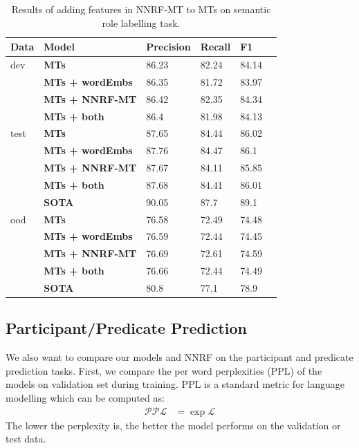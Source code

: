 \documentclass[a4paper]{article}
\begin{document}
\begin{table}[t]
\centering
\begin{tabular}{llllll}
\textbf{Data} & \textbf{Model}        &   Precision &   Recall &   F1   \\ \hline
dev    &   \textbf{MTs}               &   86.23 &   82.24    &   84.14    \\
       &   \textbf{MTs + wordEmbs}    &   86.35 &   81.72    &   83.97    \\
       &   \textbf{MTs + NNRF-MT}     &   86.42 &   82.35    &   84.34    \\
       &   \textbf{MTs + both}        &   86.4  &   81.98    &   84.13    \\ \hline
test   &   \textbf{MTs}               &   87.65 &   84.44    &   86.02    \\
       &   \textbf{MTs + wordEmbs}    &   87.76 &   84.47    &   86.1     \\
       &   \textbf{MTs + NNRF-MT}     &   87.67 &   84.11    &   85.85    \\
       &   \textbf{MTs + both}        &   87.68 &   84.41    &   86.01    \\ 
       &   \textbf{SOTA}              &   90.05 &   87.7     &   89.1     \\ \hline
ood    &   \textbf{MTs}               &   76.58 &   72.49    &   74.48    \\
       &   \textbf{MTs + wordEmbs}    &   76.59 &   72.44    &   74.45    \\
       &   \textbf{MTs + NNRF-MT}     &   76.69 &   72.61    &   74.59    \\
       &   \textbf{MTs + both}        &   76.66 &   72.44    &   74.49    \\
       &   \textbf{SOTA}              &   80.8  &   77.1     &   78.9     \\        
\end{tabular}
\caption{\label{tab:eval-srl} Results of adding features in NNRF-MT to MTs on semantic role labelling task. }
\end{table}


\subsection{Participant/Predicate Prediction}  \label{sec:wordprediction}
We also want to compare our models and NNRF on the participant and predicate prediction tasks. First, we compare the per word perplexities (PPL) of the models on validation set during training. PPL is a standard metric for language modelling which can be computed as: 
\begin{equation} \label{eq:perplexity}
\begin{aligned}
    \mathcal{PPL}
        &= \exp \mathcal{L}
\end{aligned}
\end{equation}
The lower the perplexity is, the better the model performs on the validation or test data. 
\end{document}
